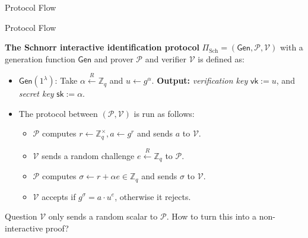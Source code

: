 \documentclass[xcolor={usenames,dvipsnames}]{beamer}
\begin{document}
\begin{frame}{Protocol Flow}
\begin{figure}[H]
    
        \label{fig:interactive_schnorr}
        \end{figure}
    \end{frame}

    \begin{frame}{Protocol Flow}
        \begin{definition}
            \textbf{The Schnorr interactive identification protocol} $\Pi_{\text{Sch}} = (\mathsf{Gen}, \mathcal{P}, \mathcal{V})$ with a generation function $\mathsf{Gen}$ and prover $\mathcal{P}$ and verifier $\mathcal{V}$ is defined as:
            \begin{itemize}
                \item $\mathsf{Gen}(1^{\lambda})$: Take $\alpha \xleftarrow{R} \mathbb{Z}_q$ and $u \gets g^{\alpha}$. \textbf{Output:} \textit{verification key} $\mathsf{vk} := u$, and \textit{secret key} $\mathsf{sk} := \alpha$.
                \item The protocol between $(\mathcal{P},\mathcal{V})$ is run as follows:
                \begin{itemize}
                    \item $\mathcal{P}$ computes $r \gets \mathbb{Z}_q^{\times}, a \gets g^{r}$ and sends $a$ to $\mathcal{V}$.
                    \item $\mathcal{V}$ sends a random challenge $e \xleftarrow{R} \mathbb{Z}_q$ to $\mathcal{P}$.
                    \item $\mathcal{P}$ computes $\sigma \gets r + \alpha e \in \mathbb{Z}_q$ and sends $\sigma$ to $\mathcal{V}$.
                    \item $\mathcal{V}$ accepts if $g^{\sigma} = a \cdot u^e$, otherwise it rejects.
                \end{itemize}
            \end{itemize}
        \end{definition}

        \begin{alertblock}{Question}
            $\mathcal{V}$ only sends a random scalar to $\mathcal{P}$. How to turn this into a non-interactive proof?
        \end{alertblock}
    \end{frame}
\end{document}
